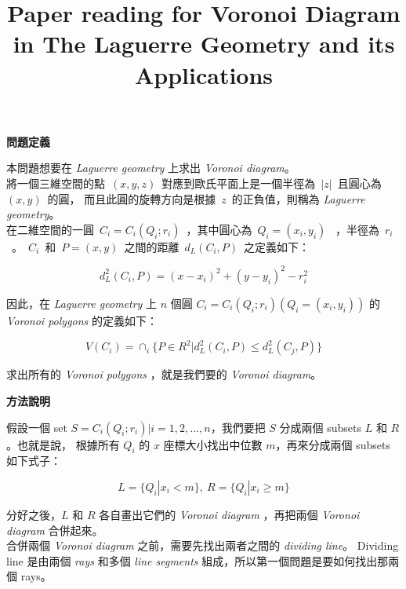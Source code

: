 \documentclass[12pt]{article}
\title{\bf{Paper reading for Voronoi Diagram in The Laguerre Geometry and its Applications}}
\date{}
\begin{document}
\maketitle

\begin{CJK}{UTF8}{bkai}

\centerline{\bf 問題定義}

本問題想要在 {\it Laguerre geometry} 上求出 {\it Voronoi diagram}。\\

將一個三維空間的點~$(x,y,z)$~對應到歐氏平面上是一個半徑為~$|z|$~且圓心為~$(x,y)$~的圓，
而且此圓的旋轉方向是根據~$z$~的正負值，則稱為 {\it Laguerre geometry}。\\

在二維空間的一圓~$C_i=C_i(Q_i;r_i)$~，其中圓心為~$Q_i=(x_i,y_i)$~
，半徑為~$r_i$~。~$C_i$~和~$P=(x,y)$~之間的距離~$d_L(C_i,P)$~之定義如下：

\begin{equation}
d_L^2(C_i,P)=(x-x_i)^2+(y-y_i)^2-r_i^2
\end{equation}

因此，在 {\it Laguerre geometry} 上 $n$ 個圓 $C_i=C_i(Q_i;r_i)(Q_i=(x_i,y_i))$ 的 {\it Voronoi polygons} 的定義如下：

\begin{equation}
V(C_i)=\cap_i \{P \in R^2 | d_L^2(C_i,P) \leq d_L^2(C_j,P) \}
\end{equation}

求出所有的 {\it Voronoi polygons} ，就是我們要的 {\it Voronoi diagram}。\\


\centerline{\bf 方法說明}

假設一個 set $S={C_i(Q_i;r_i)|i=1,2,...,n}$，我們要把 $S$ 分成兩個 subsets $L$ 和 $R$。也就是說，
根據所有 $Q_i$ 的 $x$ 座標大小找出中位數 $m$，再來分成兩個 subsets 如下式子：

\[
L=\{Q_i| x_i < m \},~R=\{Q_i| x_i \geq m \}
\]

分好之後，$L$ 和 $R$ 各自畫出它們的 {\it Voronoi diagram} ，再把兩個 {\it Voronoi diagram} 合併起來。\\


合併兩個 {\it Voronoi diagram} 之前，需要先找出兩者之間的 {\it dividing line}。 Dividing line
 是由兩個 {\it rays} 和多個 {\it line segments} 組成，所以第一個問題是要如何找出那兩個 rays。\\



\end{CJK}
\end{document}

